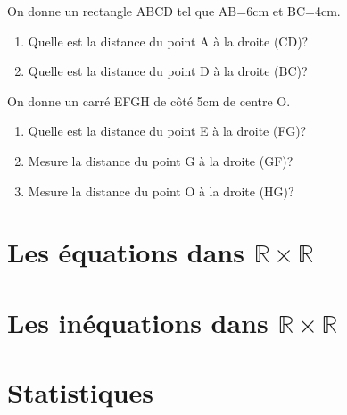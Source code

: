 \documentclass[nocrop]{sesamanuel}
\begin{document}
\exercicesbase
\begin{colonne*exercice}
\begin{exercice}
On donne un rectangle ABCD tel que AB=6cm et BC=4cm.
\begin{enumerate}
\item Quelle est la distance du point A à la droite (CD)?
\item Quelle est la distance du point D à la droite (BC)?
\end{enumerate}
\end{exercice}

\begin{exercice}
On donne un carré EFGH de côté 5cm de centre O.
\begin{enumerate}
\item Quelle est la distance du point E à la droite (FG)?
\item Mesure la distance du point G à la droite (GF)?
\item Mesure la distance du point O à la droite (HG)?
\end{enumerate}
\end{exercice}
\end{colonne*exercice}
\exercicesappr

\chapter{Les équations dans $\mathbb{R} \times \mathbb{R}$}

\chapter{Les inéquations dans $\mathbb{R} \times \mathbb{R}$}

\chapter{Statistiques}
\end{document}
